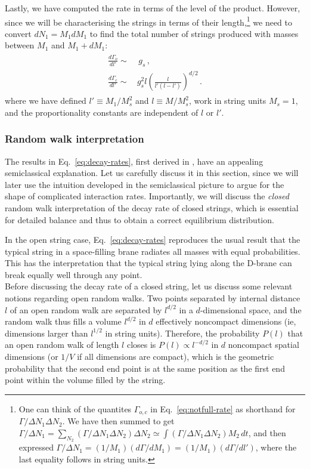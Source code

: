 \documentclass[a4paper,11pt]{article}
\newcommand{\lr}[1]{\left(#1\right)}
\begin{document}
Lastly, we have computed the rate in terms of the level of the product. 
However, since we will be characterising the strings in terms of their length,\footnote{One can think of the quantites $\Gamma_{o,c}$ in Eq.~\eqref{eq:notfull-rate} as shorthand for $\Gamma/\Delta N_1 \Delta N_2$. We have then summed to get $\Gamma/\Delta N_1=\sum_{N_2}(\Gamma/\Delta N_1 \Delta N_2)\Delta N_2\simeq \int(\Gamma/\Delta N_1 \Delta N_2) M_2 \, dt$, and then expressed $\Gamma/\Delta N_1=(1/M_1)(d\Gamma/dM_1)=(1/M_1)(d\Gamma/dl')$, where the last equality follows in string units.}
we need to convert $dN_1=M_1dM_1$ to find the total number of strings produced with masses between $M_1$ and $M_1+dM_1$:
\begin{gather}\label{eq:decay-rates}
\begin{split}
    \frac{d \Gamma_o}{d l'}\sim &  \, g_s \, , \\ 
    \frac{d\Gamma_{c}}{dl'} \sim  \, & g_s^2 l \lr{\frac{l}{l'(l-l')}}^{d/2} \, .
\end{split}
\end{gather}
where we have defined $l'\equiv M_1/M_s^2$ and $l\equiv M/M_s^2$, work in string units $M_s=1$, and the proportionality constants are independent of $l$ or $l'$.

\subsubsection*{Random walk interpretation}
The results in Eq.~\eqref{eq:decay-rates}, first derived in \cite{Manes:2001cs}, have an appealing semiclassical explanation.
Let us carefully discuss it in this section, since we will later use the intuition developed in the semiclassical picture to argue for the shape of complicated interaction rates.
Importantly, we will discuss the \textit{closed} random walk interpretation of the decay rate of closed strings, which is essential for detailed balance and thus to obtain a correct equilibrium distribution.

In the open string case, Eq.~\eqref{eq:decay-rates} reproduces the usual result that the typical string in a space-filling brane radiates all masses with equal probabilities.
This has the interpretation that the typical string lying along the D-brane can break equally well through any point.
\\

Before discussing the decay rate of a closed string, let us discuss some relevant notions regarding open random walks.
Two points separated by internal distance $l$ of an open random walk are separated by $l^{d/2}$ in a $d$-dimensional space, and the random walk thus fills a volume $l^{d/2}$ in $d$ effectively
noncompact dimensions (ie, dimensions larger than $l^{1/2}$ in string units). 
Therefore, the probability $P(l)$ that an open random walk of length 
$l$ closes is $P(l)\propto l^{-d/2}$ in $d$ noncompact spatial dimensions
(or $1/V$ if all dimensions are compact), which is the geometric probability that
the second end point is at the same position as the first end point within 
the volume filled by the string.
\end{document}
